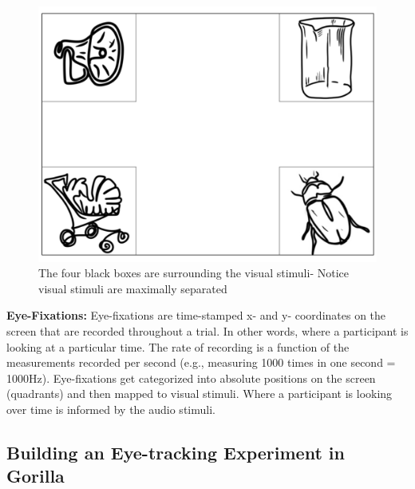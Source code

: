 \begin{figure}[h]
    \centering
    \includegraphics[scale=.35]{figures/Visual_stimuli.png}
    \caption{The four black boxes are surrounding the visual stimuli- Notice visual stimuli are maximally separated}
    \label{fig:Visual_stimuli.png}
\end{figure}

\textbf{Eye-Fixations:} Eye-fixations are time-stamped x- and y- coordinates on the screen that are recorded throughout a trial. In other words, where a participant is looking at a particular time. The rate of recording is a function of the measurements recorded per second (e.g., measuring 1000 times in one second = 1000Hz). Eye-fixations get categorized into absolute positions on the screen (quadrants) and then mapped to visual stimuli. Where a participant is looking over time is informed by the audio stimuli.

\subsection{Building an Eye-tracking Experiment in Gorilla}

